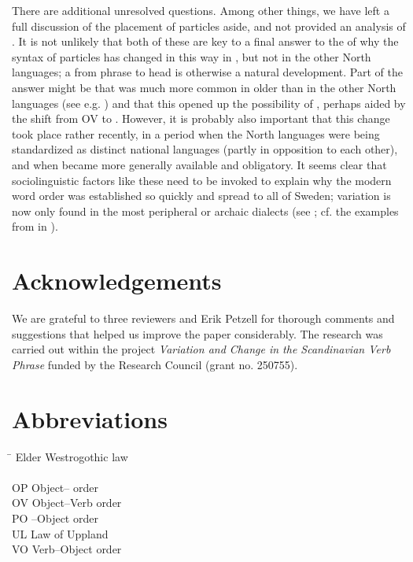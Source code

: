 \documentclass[output=paper]{langscibook}
\begin{document}
There are additional unresolved questions. Among other things, we have left a full discussion of the  placement of particles aside, and not provided an analysis of  . It is not unlikely that both of these are key to a final answer to the  of why the syntax of particles has changed in this way in , but not in the other North  languages; a  from phrase to head is otherwise a natural development. Part of the answer might be that   was much more common in older  than in the other North  languages (see e.g. \citealt{Ljunggren1932}) and that this opened up the possibility of , perhaps aided by the shift from OV to . However, it is probably also important that this change took place rather recently, in a period when the North  languages were being standardized as distinct national languages (partly in opposition to each other), and when  became more generally available and obligatory. It seems clear that sociolinguistic factors like these need to be invoked to explain why the modern word order was established so quickly and spread to all of Sweden; variation is now only found in the most peripheral or archaic dialects (see \citealt{Lundquist2014Active}; cf. the examples from  in ).


\section*{Acknowledgements}

We are grateful to three reviewers and Erik Petzell for thorough comments and suggestions that helped us improve the paper considerably. The research was carried out within the project \textit{Variation and Change in the Scandinavian Verb Phrase} funded by the  Research Council (grant no. 250755).


\section*{Abbreviations}
\begin{multicols}{2}
\begin{tabbing}
 \hspace{1ex}\=  \kill
{} \>  Elder Westrogothic law\\
 \>  \\
OP  \> Object-- order\\
OV  \> Object–Verb order\\
PO  \> –Object order\\
UL  \> Law of Uppland\\
VO  \> Verb–Object order\\
\end{tabbing}
\end{multicols}
\end{document}
